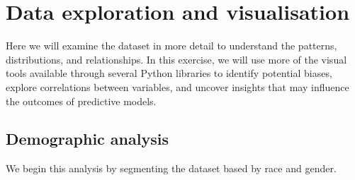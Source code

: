 \section{Data exploration and visualisation}

Here we will examine the dataset in more detail to understand the patterns, distributions, and relationships. In this exercise, we will use more of the visual tools available through several Python libraries to identify potential biases, explore correlations between variables, and uncover insights that may influence the outcomes of predictive models. 

\subsection {Demographic analysis}

We begin this analysis by segmenting the dataset based by race and gender.





